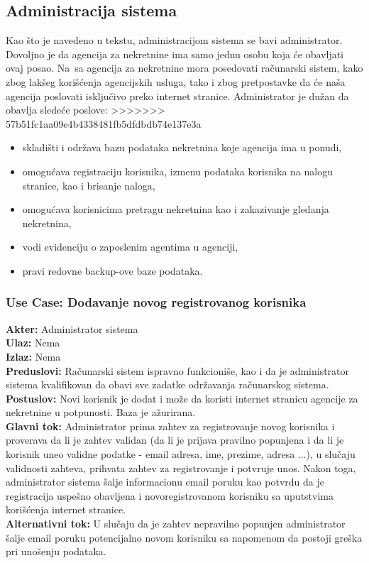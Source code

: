 \documentclass{article}
\begin{document}
\newpage
\subsection{\bfseries Administracija sistema}
\indent Kao \v {s}to je navedeno u tekstu, administracijom sistema se bavi administrator. Dovoljno je da agencija za nekretnine ima samo jednu osobu koja \' ce obavljati ovaj posao. Na\ {s}a agencija za nekretnine mora posedovati ra\v {c}unarski sistem, kako zbog lak\v {s}eg kori\v {s}\' cenja agencijskih usluga, tako i zbog pretpostavke da \'ce na\v {s}a agencija poslovati isklju\v {c}ivo preko internet stranice. Administrator je du\v {z}an da obavlja slede\' ce poslove:
>>>>>>> 57b51fc1aa09e4b4338481fb5dfdbdb74e137e3a
\begin{itemize}
    \item skladi\v {s}ti i odr\v {z}ava bazu podataka nekretnina koje agencija ima u ponudi,\\
    \item omogu\' cava registraciju korisnika, izmenu podataka korisnika na nalogu stranice, kao i brisanje naloga,\\
    \item omogu\' cava korisnicima pretragu nekretnina kao i zakazivanje gledanja nekretnina,\\
    \item vodi evidenciju o zaposlenim agentima u agenciji,\\
    \item pravi redovne backup-ove baze podataka.\\
\end{itemize}
\subsubsection{\bfseries Use Case: Dodavanje novog registrovanog korisnika}
{\bfseries Akter:} Administrator sistema\\
{\bfseries Ulaz:} Nema\\
{\bfseries Izlaz:} Nema\\
{\bfseries Preduslovi:} Ra\v {c}unarski sistem ispravno funkcioni\v {s}e, kao i da je administrator sistema kvalifikovan da obavi sve zadatke odr\v {z}avanja ra\v {c}unarskog sistema.\\
{\bfseries Postuslov:} Novi korisnik je dodat i mo\v {z}e da koristi internet stranicu agencije za nekretnine u potpunosti. Baza je a\v {z}urirana.\\
{\bfseries Glavni tok:} Administrator prima zahtev za registrovanje novog korisnika i proverava da li je zahtev validan (da li je prijava pravilno popunjena i da li je korisnik uneo validne podatke - email adresa, ime, prezime, adresa ...), u slu\v {c}aju validnosti zahteva, prihvata zahtev za registrovanje i potvr\dj uje unos. Nakon toga, administrator sistema \v {s}alje informacionu email poruku kao potvrdu da je registracija uspe\v {s}no obavljena i novoregistrovanom korisniku sa uputstvima kori\v {s}\' cenja internet stranice.\\
{\bfseries Alternativni tok:} U slu\v {c}aju da je zahtev nepravilno popunjen administrator \v {s}alje email poruku potencijalno novom korisniku sa napomenom da postoji gre\v {s}ka pri uno\v {s}enju podataka.\\
\end{document}
